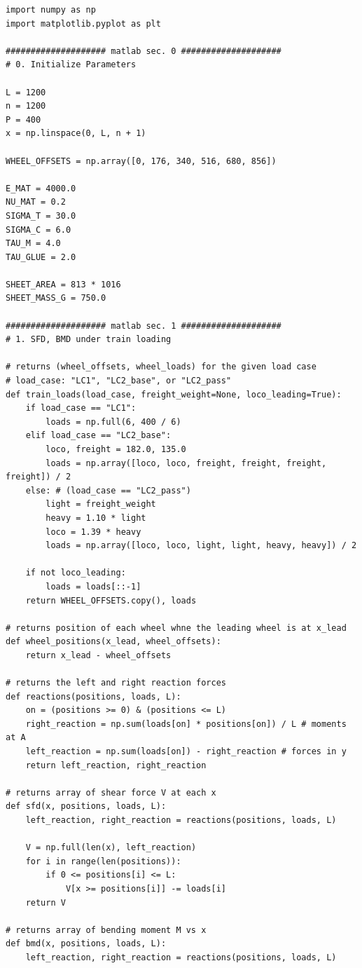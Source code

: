 \begin{verbatim}
import numpy as np
import matplotlib.pyplot as plt

#################### matlab sec. 0 ####################
# 0. Initialize Parameters

L = 1200 
n = 1200 
P = 400
x = np.linspace(0, L, n + 1)

WHEEL_OFFSETS = np.array([0, 176, 340, 516, 680, 856])

E_MAT = 4000.0
NU_MAT = 0.2
SIGMA_T = 30.0
SIGMA_C = 6.0
TAU_M = 4.0
TAU_GLUE = 2.0

SHEET_AREA = 813 * 1016
SHEET_MASS_G = 750.0

#################### matlab sec. 1 ####################
# 1. SFD, BMD under train loading

# returns (wheel_offsets, wheel_loads) for the given load case
# load_case: "LC1", "LC2_base", or "LC2_pass"
def train_loads(load_case, freight_weight=None, loco_leading=True):
    if load_case == "LC1":
        loads = np.full(6, 400 / 6)
    elif load_case == "LC2_base":
        loco, freight = 182.0, 135.0
        loads = np.array([loco, loco, freight, freight, freight, freight]) / 2
    else: # (load_case == "LC2_pass")
        light = freight_weight
        heavy = 1.10 * light
        loco = 1.39 * heavy
        loads = np.array([loco, loco, light, light, heavy, heavy]) / 2

    if not loco_leading:
        loads = loads[::-1]
    return WHEEL_OFFSETS.copy(), loads

# returns position of each wheel whne the leading wheel is at x_lead
def wheel_positions(x_lead, wheel_offsets):
    return x_lead - wheel_offsets

# returns the left and right reaction forces
def reactions(positions, loads, L):
    on = (positions >= 0) & (positions <= L)
    right_reaction = np.sum(loads[on] * positions[on]) / L # moments at A
    left_reaction = np.sum(loads[on]) - right_reaction # forces in y
    return left_reaction, right_reaction

# returns array of shear force V at each x
def sfd(x, positions, loads, L):
    left_reaction, right_reaction = reactions(positions, loads, L)

    V = np.full(len(x), left_reaction)
    for i in range(len(positions)):
        if 0 <= positions[i] <= L:
            V[x >= positions[i]] -= loads[i]
    return V

# returns array of bending moment M vs x
def bmd(x, positions, loads, L):
    left_reaction, right_reaction = reactions(positions, loads, L)


\end{verbatim}
